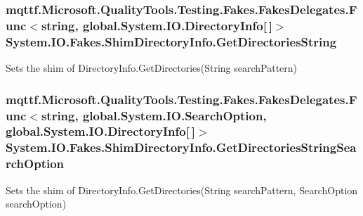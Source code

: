 \hypertarget{class_system_1_1_i_o_1_1_fakes_1_1_shim_directory_info_a1cc4108a9c89f70653363ac8acf80467}{
\subsubsection[{Get\-Directories\-String}]{\setlength{\rightskip}{0pt plus 5cm}mqttf.\-Microsoft.\-Quality\-Tools.\-Testing.\-Fakes.\-Fakes\-Delegates.\-Func$<$string, global.\-System.\-I\-O.\-Directory\-Info\mbox{[}$\,$\mbox{]}$>$ System.\-I\-O.\-Fakes.\-Shim\-Directory\-Info.\-Get\-Directories\-String\hspace{0.3cm}{\ttfamily [set]}}}\label{class_system_1_1_i_o_1_1_fakes_1_1_shim_directory_info_a1cc4108a9c89f70653363ac8acf80467}


Sets the shim of Directory\-Info.\-Get\-Directories(\-String search\-Pattern)

\hypertarget{class_system_1_1_i_o_1_1_fakes_1_1_shim_directory_info_a73e69f4d2bd48fdc697c70305ea92055}{
\subsubsection[{Get\-Directories\-String\-Search\-Option}]{\setlength{\rightskip}{0pt plus 5cm}mqttf.\-Microsoft.\-Quality\-Tools.\-Testing.\-Fakes.\-Fakes\-Delegates.\-Func$<$string, global.\-System.\-I\-O.\-Search\-Option, global.\-System.\-I\-O.\-Directory\-Info\mbox{[}$\,$\mbox{]}$>$ System.\-I\-O.\-Fakes.\-Shim\-Directory\-Info.\-Get\-Directories\-String\-Search\-Option\hspace{0.3cm}{\ttfamily [set]}}}\label{class_system_1_1_i_o_1_1_fakes_1_1_shim_directory_info_a73e69f4d2bd48fdc697c70305ea92055}


Sets the shim of Directory\-Info.\-Get\-Directories(\-String search\-Pattern, Search\-Option search\-Option)

